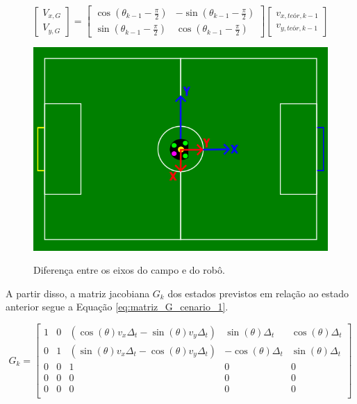 \documentclass[acronym, symbols, table, deposito]{fei}
\begin{document}
			\begin{equation}\label{eq:calculo_velocidades_globais}
				\begin{bmatrix}
					V_{x,G} \\
					V_{y,G}
				\end{bmatrix} = 
				\begin{bmatrix}
					\cos(\theta_{k-1} - \frac{\pi}{2}) & -\sin(\theta_{k-1} - \frac{\pi}{2}) \\
					\sin(\theta_{k-1} - \frac{\pi}{2}) & \cos(\theta_{k-1} - \frac{\pi}{2})
				\end{bmatrix}
				\begin{bmatrix}
					v_{x,teór,k-1} \\
					v_{y,teór,k-1}
				\end{bmatrix}
			\end{equation}
			
			\begin{figure}[!htb]
				\centering
				\caption{Diferença entre os eixos do campo e do robô.}
				\includegraphics[width=1.0\textwidth]{representacao_eixos_robo_campo.png}
				\label{fig:representacao_eixos_robo_campo}
			\end{figure}
		
			 A partir disso, a matriz jacobiana $G_k$ dos estados previstos em relação ao estado anterior segue a Equação \eqref{eq:matriz_G_cenario_1}.
		
			\begin{equation}\label{eq:matriz_G_cenario_1}
			 	G_{k} = \begin{bmatrix}
			 		1 & 0 & (\cos(\theta)v_x\Delta_t - \sin(\theta)v_y\Delta_t) & \sin(\theta)\Delta_t & \cos(\theta)\Delta_t \\
			 		0 & 1 & (\sin(\theta)v_x\Delta_t - \cos(\theta)v_y\Delta_t) & -\cos(\theta)\Delta_t & \sin(\theta)\Delta_t \\
			 		0 & 0 & 1 & 0 & 0 \\
			 		0 & 0 & 0 & 0 & 0 \\
			 		0 & 0 & 0 & 0 & 0 \\
			 	\end{bmatrix}
			 \end{equation}
		 
\end{document}
